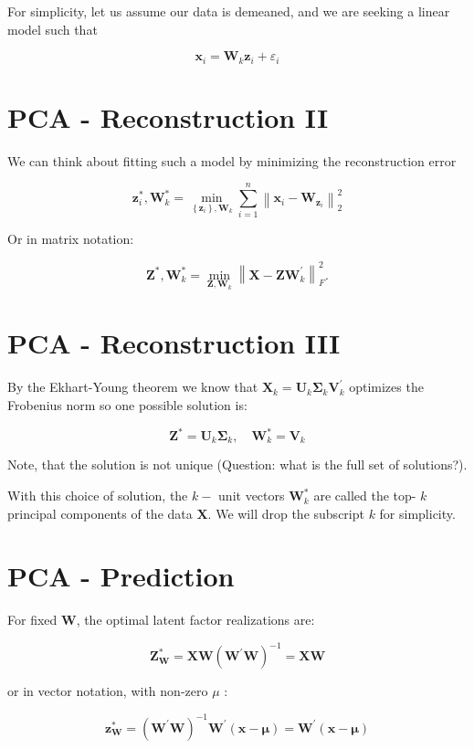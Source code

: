 \documentclass[11pt]{article}
\theoremstyle{plain} %
\theoremstyle{remark}
\begin{document}
For simplicity, let us assume our data is demeaned, and we are seeking a linear model such that

$$
\mathbf{x}_{i}=\mathbf{W}_{k} \mathbf{z}_{i}+\varepsilon_{i}
$$

\section*{PCA - Reconstruction II}
We can think about fitting such a model by minimizing the reconstruction error

$$
\mathbf{z}_{i}^{*}, \mathbf{W}_{k}^{*}=\min _{\left\{\mathbf{z}_{i}\right\}, \mathbf{W}_{k}} \sum_{i=1}^{n}\left\|\mathbf{x}_{i}-\mathbf{W}_{\mathbf{z}_{i}}\right\|_{2}^{2}
$$

Or in matrix notation:

$$
\mathbf{Z}^{*}, \mathbf{W}_{k}^{*}=\min _{\mathbf{Z}, \mathbf{W}_{k}}\left\|\mathbf{X}-\mathbf{Z} \mathbf{W}_{k}^{\prime}\right\|_{F}^{2} .
$$

\section*{PCA - Reconstruction III}
By the Ekhart-Young theorem we know that $\mathbf{X}_{k}=\mathbf{U}_{k} \boldsymbol{\Sigma}_{k} \mathbf{V}_{k}^{\prime}$ optimizes the Frobenius norm so one possible solution is:

$$
\mathbf{Z}^{*}=\mathbf{U}_{k} \boldsymbol{\Sigma}_{k}, \quad \mathbf{W}_{k}^{*}=\mathbf{V}_{k}
$$

Note, that the solution is not unique (Question: what is the full set of solutions?).

With this choice of solution, the $k-$ unit vectors $\mathbf{W}_{k}^{*}$ are called the top- $k$ principal components of the data $\mathbf{X}$. We will drop the subscript $k$ for simplicity.

\section*{PCA - Prediction}
For fixed $\mathbf{W}$, the optimal latent factor realizations are:

$$
\mathbf{Z}_{\mathbf{W}}^{*}=\mathbf{X W}\left(\mathbf{W}^{\prime} \mathbf{W}\right)^{-1}=\mathbf{X W}
$$

or in vector notation, with non-zero $\mu$ :

$$
\mathbf{z}_{\mathbf{W}}^{*}=\left(\mathbf{W}^{\prime} \mathbf{W}\right)^{-1} \mathbf{W}^{\prime}(\mathbf{x}-\boldsymbol{\mu})=\mathbf{W}^{\prime}(\mathbf{x}-\boldsymbol{\mu})
$$
\end{document}
